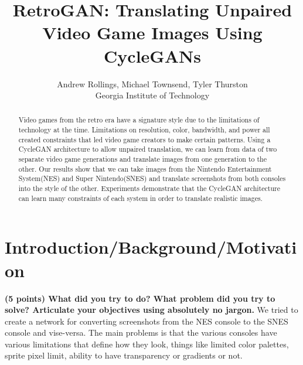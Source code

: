 \documentclass[10pt,twocolumn,letterpaper]{article}
\begin{document}
\title{RetroGAN: Translating Unpaired Video Game Images Using CycleGANs}

\author{Andrew Rollings, Michael Townsend, Tyler Thurston\\
   Georgia Institute of Technology\\
}

\maketitle

\begin{abstract}
   Video games from the retro era have a signature style due to the limitations of technology at the time. Limitations on resolution, color, bandwidth, and power all created constraints that led video game creators to make certain patterns. Using a CycleGAN architecture to allow unpaired translation, we can learn from data of two separate video game generations and translate images from one generation to the other. Our results show that we can take images from the Nintendo Entertainment System(NES) and Super Nintendo(SNES) and translate screenshots from both consoles into the style of the other. Experiments demonstrate that the CycleGAN architecture can learn many constraints of each system in order to translate realistic images.
\end{abstract}

\section{Introduction/Background/Motivation}
\textbf{(5 points) What did you try to do? What problem did you try to solve? Articulate your objectives using absolutely no jargon.}
We tried to create a network for converting screenshots from the NES console to the SNES console and vise-versa. The main problems is that the various consoles have various limitations that define how they look, things like limited color palettes, sprite pixel limit, ability to have transparency or gradients or not.
\end{document}
